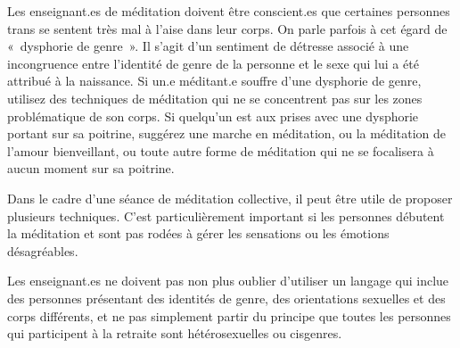 \documentclass[12pt,openany]{book}
\begin{document}
\noindent Les enseignant.es de méditation doivent être conscient.es que certaines personnes trans se sentent très mal à l’aise dans leur corps. On parle parfois à cet égard de \mbox{« d}ysphorie de genr\mbox{e »}. Il s’agit d’un sentiment de détresse associé à une incongruence entre l’identité de genre de la personne et le sexe qui lui a été attribué à la naissance. Si un.e méditant.e souffre d’une dysphorie de genre, utilisez des techniques de méditation qui ne se concentrent pas sur les zones problématique de son corps. Si quelqu’un est aux prises avec une dysphorie portant sur sa poitrine, suggérez une marche en méditation, ou la méditation de l’amour bienveillant, ou toute autre forme de méditation qui ne se focalisera à aucun moment sur sa poitrine.

Dans le cadre d’une séance de méditation collective, il peut être utile de proposer plusieurs techniques. C’est particulièrement important si les personnes débutent la méditation et sont pas rodées à gérer les sensations ou les émotions désagréables.

Les enseignant.es ne doivent pas non plus oublier d’utiliser un langage qui inclue des personnes présentant des identités de genre, des orientations sexuelles et des corps différents, et ne pas simplement partir du principe que toutes les personnes qui participent à la retraite sont hétérosexuelles ou cisgenres.

\newpage
\thispagestyle{empty}

\vfill

\begin{figure}[h]
    \centering
\end{figure}
\end{document}
